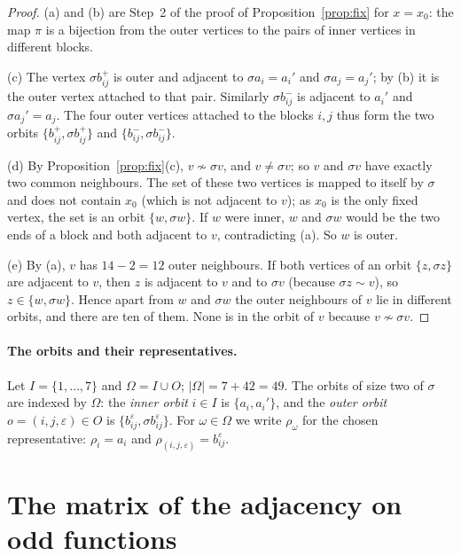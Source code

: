 \documentclass[11pt,a4paper]{article}
\theoremstyle{definition}
\theoremstyle{remark}
\newcommand{\sg}{\sigma}
\newcommand{\Om}{\Omega}
\begin{document}
\begin{proof}
(a) and (b) are Step~2 of the proof of Proposition~\ref{prop:fix} for $x=x_0$: the map $\pi$ is a bijection from the
outer vertices to the pairs of inner vertices in different blocks.

(c) The vertex $\sg b_{ij}^{+}$ is outer and adjacent to $\sg a_i=a_i'$ and $\sg a_j=a_j'$; by (b) it is the outer
vertex attached to that pair. Similarly $\sg b_{ij}^{-}$ is adjacent to $a_i'$ and $\sg a_j'=a_j$. The four outer
vertices attached to the blocks $i,j$ thus form the two orbits $\{b_{ij}^{+},\sg b_{ij}^{+}\}$ and
$\{b_{ij}^{-},\sg b_{ij}^{-}\}$.

(d) By Proposition~\ref{prop:fix}(c), $v\not\sim\sg v$, and $v\ne\sg v$; so $v$ and $\sg v$ have exactly two common
neighbours. The set of these two vertices is mapped to itself by $\sg$ and does not contain $x_0$ (which is not
adjacent to $v$); as $x_0$ is the only fixed vertex, the set is an orbit $\{w,\sg w\}$. If $w$ were inner, $w$ and
$\sg w$ would be the two ends of a block and both adjacent to $v$, contradicting (a). So $w$ is outer.

(e) By (a), $v$ has $14-2=12$ outer neighbours. If both vertices of an orbit $\{z,\sg z\}$ are adjacent to $v$,
then $z$ is adjacent to $v$ and to $\sg v$ (because $\sg z\sim v$), so $z\in\{w,\sg w\}$. Hence apart from $w$ and
$\sg w$ the outer neighbours of $v$ lie in different orbits, and there are ten of them. None is in the orbit of $v$
because $v\not\sim\sg v$.
\end{proof}

\paragraph{The orbits and their representatives.} Let $I=\{1,\dots,7\}$ and $\Om=I\cup O$; $|\Om|=7+42=49$. The
orbits of size two of $\sg$ are indexed by $\Om$: the \emph{inner orbit} $i\in I$ is $\{a_i,a_i'\}$, and the
\emph{outer orbit} $o=(i,j,\varepsilon)\in O$ is $\{b_{ij}^{\varepsilon},\sg b_{ij}^{\varepsilon}\}$. For
$\omega\in\Om$ we write $\rho_\omega$ for the chosen representative: $\rho_i=a_i$ and
$\rho_{(i,j,\varepsilon)}=b_{ij}^{\varepsilon}$.

\section{The matrix of the adjacency on odd functions}\label{sec:S}
\end{document}
